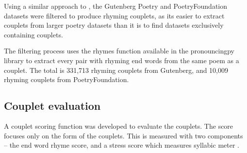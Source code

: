 \documentclass[11pt,a4paper]{article}
\begin{document}
Using a similar approach to \citet{cole}, the Gutenberg Poetry \cite{gutenbergpoetry} and PoetryFoundation \cite{poetryfoundationkaggle} datasets were filtered to produce rhyming couplets, as its easier to extract couplets from larger poetry datasets than it is to find datasets exclusively containing couplets.

The filtering process uses the rhymes function available in the pronouncingpy library to extract every pair with rhyming end words from the same poem as a couplet. The total is 331,713 rhyming couplets from Gutenberg, and 10,009 rhyming couplets from PoetryFoundation.

\subsection{Couplet evaluation}
\label{sec:coupleteval}

A couplet scoring function was developed to evaluate the couplets. The score focuses only on the form of the couplets. This is measured with two components -- the end word rhyme score, and a stress score which measures syllabic meter \cite{meter_def}.
\end{document}
